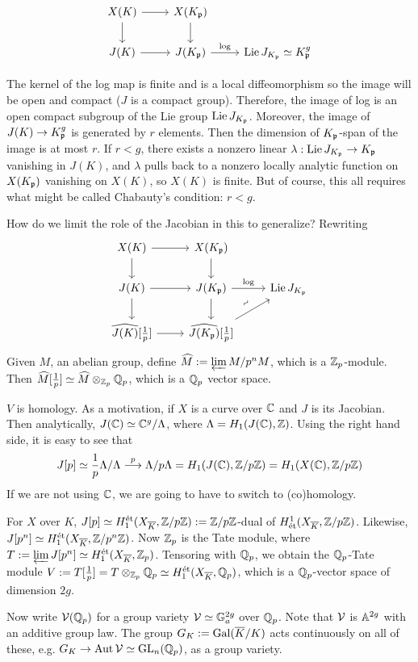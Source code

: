	\[
	\begin{tikzcd}
	X(K) \arrow{r} \arrow{d} &  X(K_\p) \arrow{d} \\
	J(K) \arrow{r} & J(K_\p) \arrow{r}{\log} & \lie J_{K_\p} \simeq K_\p^g
	\end{tikzcd}
	\]

The kernel of the log map is finite and is a local diffeomorphism so the image will be open and compact ($J$ is a compact group). Therefore, the image of log is an open compact subgroup of the Lie group $\operatorname{Lie} J_{K_{\mathfrak{p}}}$. Moreover, the image of $J(K) \to K_{\mathfrak{p}}^g$ is generated by $r$ elements. Then the dimension of $K_{\mathfrak{p}}$-span of the image is at most $r$. If $r< g$, there exists a nonzero linear $\lambda: \operatorname{Lie} J_{K_{\mathfrak{p}}} \to K_{\mathfrak{p}}$ vanishing in $J(K)$, and $\lambda$ pulls back to a nonzero locally analytic function on $X(K_{\mathfrak{p}})$ vanishing on $X(K)$, so $X(K)$ is finite. But of course, this all requires what might be called Chabauty's condition: $r<g$. 


How do we limit the role of the Jacobian in this to generalize? Rewriting
	\[
	\begin{tikzcd}
	X(K) \arrow{d} \arrow{r} & X(K_\p) \arrow{d} \\
	J(K) \arrow{r} \arrow{d} & J(K_\p) \arrow{r}{\log} \arrow{d} & \lie J_{K_\p} \\
	\widehat{J(K)}[\frac{1}{p}] \arrow{r} & \widehat{J(K_\p)}[\frac{1}{p}] \arrow{ur}{\rotatebox{45}{$\sim$}} 
	\end{tikzcd}
	\]
Given $M$, an abelian group, define $\widehat{M}:= \varprojlim M/p^nM$, which is a $\mathbb{Z}_p$-module. Then $\widehat{M}[\frac{1}{p}] \simeq \widehat{M} \otimes_{\mathbb{Z}_p} \mathbb{Q}_p$, which is a $\mathbb{Q}_p$ vector space. 


$V$ is \etale homology. As a motivation, if $X$ is a curve over $\mathbb{C}$ and $J$ is its Jacobian. Then analytically, $J(\mathbb{C}) \simeq \mathbb{C}^g/ \Lambda$, where $\Lambda= H_1(J(\mathbb{C}),\mathbb{Z})$. Using the right hand side, it is easy to see that 
	\[
	J[p] \simeq \frac{1}{p} \Lambda/\Lambda \stackrel{p}{\longrightarrow} \Lambda/p\Lambda= H_1(J(\mathbb{C}), \mathbb{Z}/p\mathbb{Z})= H_1(X(\mathbb{C}),\mathbb{Z}/p\mathbb{Z}) 
	\]
If we are not using $\mathbb{C}$, we are going to have to switch to \Etale (co)homology.


For $X$ over $K$, $J[p] \simeq H_1^{\text{\'et}}(X_{\overline{K}}, \mathbb{Z}/p\mathbb{Z}):= \mathbb{Z}/p\mathbb{Z}$-dual of $H^1_{\text{\'et}}(X_{\overline{K}}, \mathbb{Z}/p\mathbb{Z})$. Likewise, $J[p^n] \simeq H_1^{\text{\'et}}(X_{\overline{K}}, \mathbb{Z}/p^n\mathbb{Z})$. Now $\mathbb{Z}_p$ is the Tate module, where $T:= \varprojlim J[p^n] \simeq H_1^{\text{\'et}}(X_{\overline{K}}, \mathbb{Z}_p)$. Tensoring with $\mathbb{Q}_p$, we obtain the $\mathbb{Q}_p$-Tate module $V:= T[\frac{1}{p}]= T \otimes_{\mathbb{Z}_p} \mathbb{Q}_p \simeq H_1^{\text{\'et}}(X_{\overline{K}}, \mathbb{Q}_p)$, which is a $\mathbb{Q}_p$-vector space of dimension $2g$. 


Now write $\mathcal{V}(\mathbb{Q}_p)$ for a group variety $\mathcal{V} \simeq \mathbb{G}_a^{2g}$ over $\mathbb{Q}_p$. Note that $\mathcal{V}$ is $\mathbb{A}^{2g}$ with an additive group law. The group $G_K:= \operatorname{Gal}(\overline{K}/K)$ acts continuously on all of these, e.g. $G_K \to \operatorname{Aut} \mathcal{V} \simeq \operatorname{GL}_n(\mathbb{Q}_p)$, as a group variety. 


